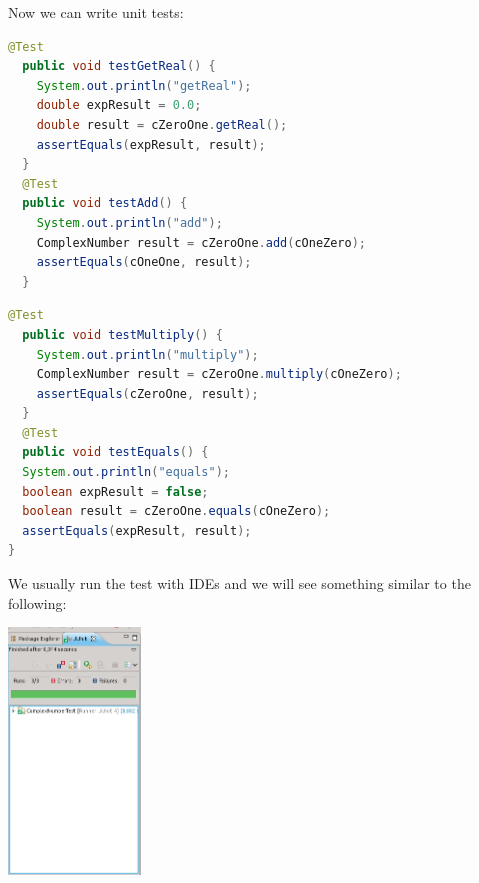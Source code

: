 \documentclass[11pt, xcolor=svgnames]{beamer}
\begin{document}

\begin{frame}[fragile]
Now we can write unit tests:

\begin{lstlisting}[language=Java,basicstyle=\tiny]
  @Test  
  public void testGetReal() {
    System.out.println("getReal");
    double expResult = 0.0;
    double result = cZeroOne.getReal();
    assertEquals(expResult, result);
  }
  @Test
  public void testAdd() {
    System.out.println("add");
    ComplexNumber result = cZeroOne.add(cOneZero);
    assertEquals(cOneOne, result);
  }
\end{lstlisting}
\end{frame}

\begin{frame}[fragile]

\begin{lstlisting}[language=Java,basicstyle=\tiny]
  @Test
  public void testMultiply() {
    System.out.println("multiply");
    ComplexNumber result = cZeroOne.multiply(cOneZero);
    assertEquals(cZeroOne, result);
  }
  @Test
  public void testEquals() {
  System.out.println("equals");
  boolean expResult = false;
  boolean result = cZeroOne.equals(cOneZero);
  assertEquals(expResult, result);
}
\end{lstlisting}


\end{frame}


\begin{frame}

We usually run the test with IDEs and we will see something similar to the following:

\begin{center}
\includegraphics[width=100pt]{./figs/Results}
\end{center}

\end{frame}
\end{document}
